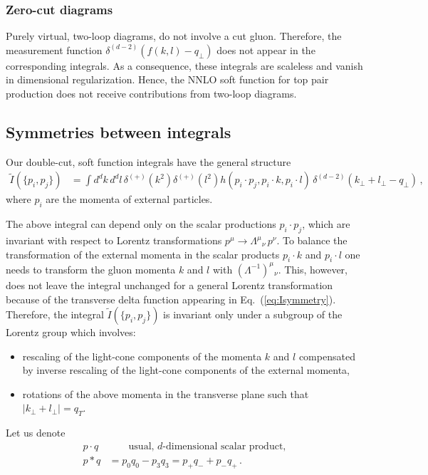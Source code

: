 \documentclass[a4paper,11pt]{article}
\numberwithin{equation}{section}
\begin{document}
\subsubsection*{Zero-cut diagrams}

Purely virtual, two-loop diagrams, do not involve a cut gluon. Therefore, the
measurement function $\delta^{(d-2)}(f(k,l) - q_\perp)$ does not appear in the
corresponding integrals. As a consequence, these integrals are scaleless and
vanish in dimensional regularization. Hence, the NNLO soft function for top
pair production does not receive contributions from two-loop diagrams.

\subsection{Symmetries between integrals}
\label{sec:intsym}

Our double-cut, soft function integrals have the general structure
%
\begin{align}
  \tilde I(\{p_i, p_j\}) &= \int d^dk\, d^d l\, \delta^{(+)}(k^2)
  \delta^{(+)}(l^2) h(p_i\cdot p_j, p_i\cdot k, p_i \cdot l)\,
  \delta^{(d-2)}(k_\perp+l_\perp -q_\perp)\,,
  \label{eq:Isymmetry}
\end{align}
%
where $p_i$ are the momenta of external particles.

The above integral can depend only on the scalar productions $p_i \cdot p_j$,
which are invariant with respect to Lorentz transformations 
$p^\mu \to \Lambda^\mu{}_\nu\, p^\nu$. 
To balance the transformation of the
external momenta in the scalar products $p_i \cdot k$ and $p_i \cdot l$ one
needs to transform the gluon momenta $k$ and $l$ with
$\left(\Lambda^{-1}\right)^\mu{}_\nu$. 
%
This, however, does not leave the integral unchanged for a general Lorentz
transformation because of the transverse delta function appearing in
Eq.~(\ref{eq:Isymmetry}).
%
Therefore, the integral $\tilde I(\{p_i, p_j\})$ is invariant
only under a subgroup of the Lorentz group which involves:
%
\begin{itemize}
  \item
  rescaling of the light-cone components of the momenta $k$ and $l$ compensated
  by inverse rescaling of the light-cone components of the external momenta,
  \item
  rotations of the above momenta in the transverse plane such that 
  $|k_\perp + l_\perp| = q_T$.
\end{itemize}
%
Let us denote
\begin{align}
  p\cdot q & \qquad 
  \text{usual, $d$-dimensional scalar product}, \\
  p * q & = p_0 q_0 - p_3 q_3 = p_+ q_- + p_- q_+\,.
\end{align}
\end{document}
